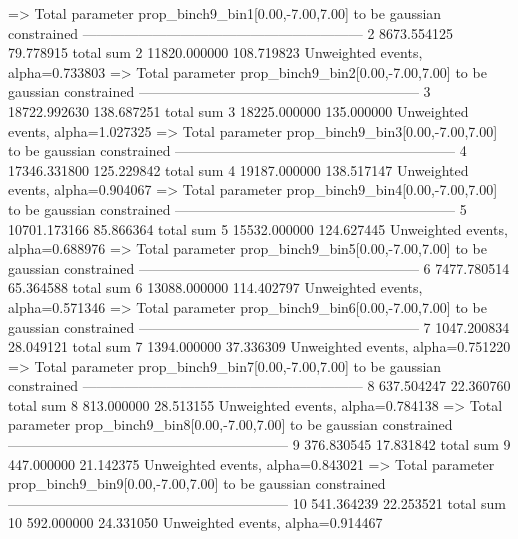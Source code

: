   => Total parameter prop_binch9_bin1[0.00,-7.00,7.00] to be gaussian constrained
------------------------------------------------------------
2          8673.554125     79.778915       total sum                     
2          11820.000000    108.719823      Unweighted events, alpha=0.733803
  => Total parameter prop_binch9_bin2[0.00,-7.00,7.00] to be gaussian constrained
------------------------------------------------------------
3          18722.992630    138.687251      total sum                     
3          18225.000000    135.000000      Unweighted events, alpha=1.027325
  => Total parameter prop_binch9_bin3[0.00,-7.00,7.00] to be gaussian constrained
------------------------------------------------------------
4          17346.331800    125.229842      total sum                     
4          19187.000000    138.517147      Unweighted events, alpha=0.904067
  => Total parameter prop_binch9_bin4[0.00,-7.00,7.00] to be gaussian constrained
------------------------------------------------------------
5          10701.173166    85.866364       total sum                     
5          15532.000000    124.627445      Unweighted events, alpha=0.688976
  => Total parameter prop_binch9_bin5[0.00,-7.00,7.00] to be gaussian constrained
------------------------------------------------------------
6          7477.780514     65.364588       total sum                     
6          13088.000000    114.402797      Unweighted events, alpha=0.571346
  => Total parameter prop_binch9_bin6[0.00,-7.00,7.00] to be gaussian constrained
------------------------------------------------------------
7          1047.200834     28.049121       total sum                     
7          1394.000000     37.336309       Unweighted events, alpha=0.751220
  => Total parameter prop_binch9_bin7[0.00,-7.00,7.00] to be gaussian constrained
------------------------------------------------------------
8          637.504247      22.360760       total sum                     
8          813.000000      28.513155       Unweighted events, alpha=0.784138
  => Total parameter prop_binch9_bin8[0.00,-7.00,7.00] to be gaussian constrained
------------------------------------------------------------
9          376.830545      17.831842       total sum                     
9          447.000000      21.142375       Unweighted events, alpha=0.843021
  => Total parameter prop_binch9_bin9[0.00,-7.00,7.00] to be gaussian constrained
------------------------------------------------------------
10         541.364239      22.253521       total sum                     
10         592.000000      24.331050       Unweighted events, alpha=0.914467
